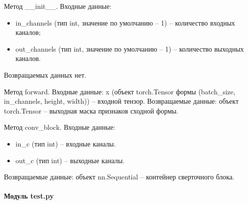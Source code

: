 \renewcommand{\arraystretch}{1.0} %
\vspace{-\baselineskip}
Метод  \_\_init\_\_. Входные данные: 
\begin{itemize}
	\item in\_channels (тип int, значение по умолчанию -- 1) -- количество входных каналов;
	\item out\_channels (тип int, значение по умолчанию -- 1) -- количество выходных каналов.
\end{itemize}
Возвращаемых данных нет.

Метод forward. Входные данные: x (объект torch.Tensor формы (batch\_size, in\_channels, height, width)) -- входной тензор. Возвращаемые данные: объект torch.Tensor -- выходная маска признаков сходной формы.

Метод conv\_block. Входные данные:
\begin{itemize}
	\item in\_c (тип int) -- входные каналы.
	\item out\_c (тип int) -- выходные каналы. 
\end{itemize}
Возвращаемые данные: объект nn.Sequential -- контейнер сверточного блока.

\paragraph{Модуль test.py}


